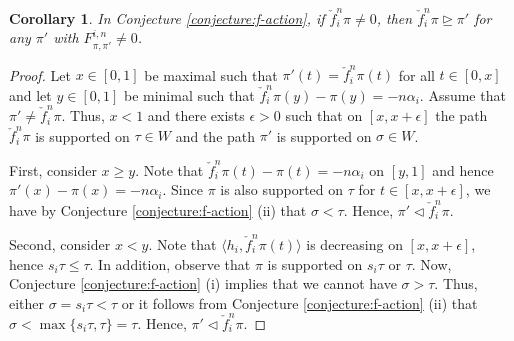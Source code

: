 \documentclass[final]{amsart}
\theoremstyle{plain}
\newtheorem{corollary}{Corollary}[section]
\theoremstyle{definition}
\newcommand{\cf}{\check{f}}
\begin{document}
\begin{corollary}
    \label{corollary:f-action-leading-term}
    In Conjecture \ref{conjecture:f-action}, if $\cf_i^n\pi \neq 0$, then $\cf_i^n\pi \trianglerighteq \pi'$ for any $\pi'$ with $F_{\pi,\pi'}^{i,n} \neq 0$.
\end{corollary}
\begin{proof}
    Let $x\in [0, 1]$ be maximal such that $\pi'(t) = \cf_i^n\pi(t)$ for all $t \in [0, x]$ and let $y \in [0, 1]$ be minimal such that $\cf_i^n\pi(y) - \pi(y) = -n\alpha_i$.
    Assume that $\pi' \neq \cf_i^n\pi$.
    Thus, $x < 1$ and there exists $\epsilon > 0$ such that on $[x, x+\epsilon]$ the path $\cf_i^n\pi$ is supported on $\tau \in W$ and the path $\pi'$ is supported on $\sigma \in W$.

    First, consider $x \ge y$.
    Note that $\cf_i^n\pi(t) - \pi(t) = -n\alpha_i$ on $[y, 1]$ and hence $\pi'(x) - \pi(x) = -n\alpha_i$.
    Since $\pi$ is also supported on $\tau$ for $t \in [x, x+\epsilon]$, we have by Conjecture \ref{conjecture:f-action} (ii) that $\sigma < \tau$.
    Hence, $\pi' \triangleleft \cf_i^n\pi$.

    Second, consider $x < y$.
    Note that $\langle h_i, \cf_i^n\pi(t)\rangle$ is decreasing on $[x, x+\epsilon]$, hence $s_i\tau \le \tau$.
    In addition, observe that $\pi$ is supported on $s_i\tau$ or $\tau$.
    Now, Conjecture \ref{conjecture:f-action} (i) implies that we cannot have $\sigma > \tau$.
    Thus, either $\sigma = s_i\tau < \tau$ or it follows from Conjecture \ref{conjecture:f-action} (ii) that $\sigma < \max\{s_i\tau, \tau\} = \tau$.
    Hence, $\pi' \triangleleft \cf_i^n\pi$.
\end{proof}
\end{document}
